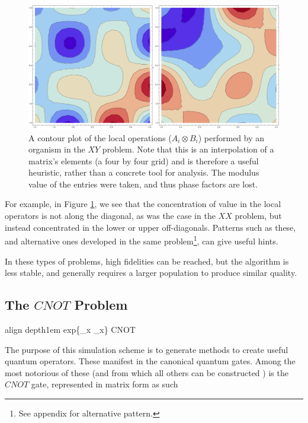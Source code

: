 \documentclass[11pt,twocolumn]{article}
\newcommand*\mystrut[1]{\vrule width0pt height0pt depth#1\relax}
\begin{document}
    \begin{figure}[htpb]
		\centering
			\includegraphics[scale=0.2]{xy_test_matrices.png}
		\centering
		\caption{A contour plot of the local operations ($A_i \otimes B_i$) performed by an organism in the $XY$ problem. Note that this is an interpolation of a matrix's elements (a four by four grid) and is therefore a useful heuristic, rather than a concrete tool for analysis. The modulus value of the entries were taken, and thus phase factors are lost.}
		\label{fig:xy_matrix}
	\end{figure}

	For example, in Figure \ref{fig:xy_matrix}, we see that the concentration of value in the local operators is not along the diagonal, as was the case in the $XX$ problem, but instead concentrated in the lower or upper off-diagonals. Patterns such as these, and alternative ones developed in the same problem\footnote{See appendix for alternative pattern.}, can give useful hints. 

	In these types of problems, high fidelities can be reached, but the algorithm is less stable, and generally requires a larger population to produce similar quality. 
	


	\subsection{The $CNOT$ Problem}

	\begin{empheq}[box=\fbox]{align}
		\mystrut{1em} exp\{\sigma_x \otimes \sigma_x\} \mapsto CNOT
	\end{empheq}

	The purpose of this simulation scheme is to generate methods to create useful quantum operators. These manifest in the canonical quantum gates. Among the most notorious of these (and from which all others can be constructed \cite{oliviera}) is the $CNOT$ gate, represented in matrix form as such
\end{document}
